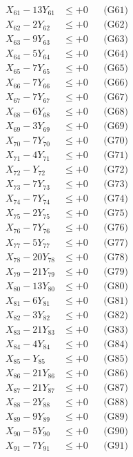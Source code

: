 \documentclass[a4paper,10pt]{article}
\begin{document}
{\begin{align}
X_{61} - 13Y_{61} &\leq +0 && \text{(G61)} \\
\allowbreak
X_{62} - 2Y_{62} &\leq +0 && \text{(G62)} \\
X_{63} - 9Y_{63} &\leq +0 && \text{(G63)} \\
X_{64} - 5Y_{64} &\leq +0 && \text{(G64)} \\
X_{65} - 7Y_{65} &\leq +0 && \text{(G65)} \\
X_{66} - 7Y_{66} &\leq +0 && \text{(G66)} \\
X_{67} - 7Y_{67} &\leq +0 && \text{(G67)} \\
X_{68} - 6Y_{68} &\leq +0 && \text{(G68)} \\
X_{69} - 3Y_{69} &\leq +0 && \text{(G69)} \\
X_{70} - 7Y_{70} &\leq +0 && \text{(G70)} \\
X_{71} - 4Y_{71} &\leq +0 && \text{(G71)} \\
\allowbreak
X_{72} - Y_{72} &\leq +0 && \text{(G72)} \\
X_{73} - 7Y_{73} &\leq +0 && \text{(G73)} \\
X_{74} - 7Y_{74} &\leq +0 && \text{(G74)} \\
X_{75} - 2Y_{75} &\leq +0 && \text{(G75)} \\
X_{76} - 7Y_{76} &\leq +0 && \text{(G76)} \\
X_{77} - 5Y_{77} &\leq +0 && \text{(G77)} \\
X_{78} - 20Y_{78} &\leq +0 && \text{(G78)} \\
X_{79} - 21Y_{79} &\leq +0 && \text{(G79)} \\
X_{80} - 13Y_{80} &\leq +0 && \text{(G80)} \\
X_{81} - 6Y_{81} &\leq +0 && \text{(G81)} \\
\allowbreak
X_{82} - 3Y_{82} &\leq +0 && \text{(G82)} \\
X_{83} - 21Y_{83} &\leq +0 && \text{(G83)} \\
X_{84} - 4Y_{84} &\leq +0 && \text{(G84)} \\
X_{85} - Y_{85} &\leq +0 && \text{(G85)} \\
X_{86} - 21Y_{86} &\leq +0 && \text{(G86)} \\
X_{87} - 21Y_{87} &\leq +0 && \text{(G87)} \\
X_{88} - 2Y_{88} &\leq +0 && \text{(G88)} \\
X_{89} - 9Y_{89} &\leq +0 && \text{(G89)} \\
X_{90} - 5Y_{90} &\leq +0 && \text{(G90)} \\
X_{91} - 7Y_{91} &\leq +0 && \text{(G91)} \\

\end{align}}
\end{document}
